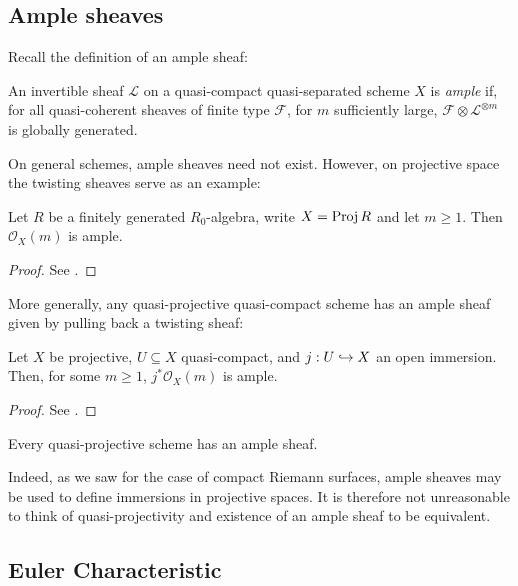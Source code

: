 \documentclass[12pt]{ociamthesis}  %
\begin{document}
\subsection{Ample sheaves}

Recall the definition of an ample sheaf:

\begin{definition}
  An invertible sheaf $\mathscr L$ on a quasi-compact quasi-separated
  scheme $X$ is \emph{ample} if, for all quasi-coherent sheaves of
  finite type $\mathscr F$, for $m$ sufficiently large,
  $\mathscr F\otimes \mathscr L^{\otimes m}$ is
  globally generated.
\end{definition}

On general schemes, ample sheaves need not exist. However, on
projective space the twisting sheaves serve as an example:

\begin{proposition}
  Let $R$ be a finitely generated $R_0$-algebra,
  write $X=\operatorname{Proj} R$ and let $m\geq 1$. Then
  $\mathscr O_X(m)$ is ample.
  \begin{proof}
    See \cite[Example 13.45]{gortz2010}.
    \missingproof
  \end{proof}
\end{proposition}

More generally, any quasi-projective quasi-compact scheme has
an ample sheaf given by pulling back a twisting sheaf:

\begin{proposition}
  Let $X$ be projective, $U\subseteq X$ quasi-compact, and
  $j : U \hookrightarrow X$ an open immersion. Then, for some $m\geq 1$,
  $j^*\mathscr O_X(m)$ is ample.
  \begin{proof}
    See \cite[\href{https://stacks.math.columbia.edu/tag/01Q2}{Tag 01Q2}]{stacks-project}.
    \missingproof
  \end{proof}
\end{proposition}

\begin{corollary}
  Every quasi-projective scheme has an ample sheaf.
\end{corollary}

Indeed, as we saw for the case of compact Riemann surfaces, ample
sheaves may be used to define immersions in projective spaces. It is
therefore not unreasonable to think of quasi-projectivity and existence
of an ample sheaf to be equivalent.

\subsection{Euler Characteristic}
\end{document}
